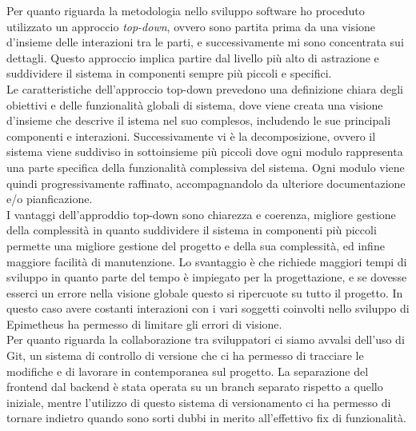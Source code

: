 Per quanto riguarda la metodologia nello sviluppo software ho proceduto utilizzato un approccio \textit{top-down}, ovvero sono partita prima da una visione d'insieme delle interazioni tra le parti, e successivamente mi sono concentrata sui dettagli. Questo approccio implica partire dal livello più alto di astrazione e suddividere il sistema in componenti sempre più piccoli e specifici. \\
Le caratteristiche dell'approccio top-down prevedono una definizione chiara degli obiettivi e delle funzionalità globali di sistema, dove viene creata una visione d'insieme che descrive il istema nel suo complesos, includendo le sue principali componenti e interazioni. Successivamente vi è la decomposizione, ovvero il sistema viene suddiviso in sottoinsieme più piccoli dove ogni modulo rappresenta una parte specifica della funzionalità complessiva del sistema. Ogni modulo viene quindi progressivamente raffinato, accompagnandolo da ulteriore documentazione e/o pianficazione. \\
I vantaggi dell'approddio top-down sono chiarezza e coerenza, migliore gestione della complessità in quanto suddividere il sistema in componenti più piccoli permette una migliore gestione del progetto e della sua complessità, ed infine maggiore facilità di manutenzione. Lo svantaggio è che richiede maggiori tempi di sviluppo in quanto parte del tempo è impiegato per la progettazione, e se dovesse esserci un errore nella visione globale questo si ripercuote su tutto il progetto. In questo caso avere costanti interazioni con i vari soggetti coinvolti nello sviluppo di Epimetheus ha permesso di limitare gli errori di visione.\\

Per quanto riguarda la collaborazione tra sviluppatori ci siamo avvalsi dell'uso di Git, un sistema di controllo di versione che ci ha permesso di tracciare le modifiche e di lavorare in contemporanea sul progetto. La separazione del frontend dal backend è stata operata su un branch separato rispetto a quello iniziale, mentre l'utilizzo di questo sistema di versionamento ci ha permesso di tornare indietro quando sono sorti dubbi in merito all'effettivo fix di funzionalità. 



